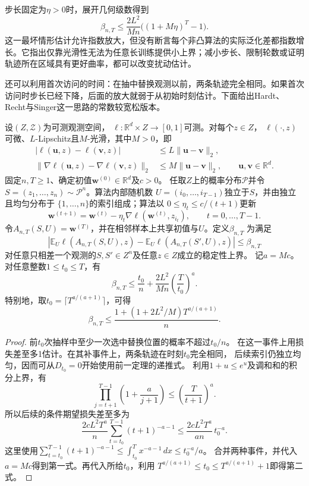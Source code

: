 步长固定为$\eta>0$时，展开几何级数得到
\[
 \beta_{n,T}\leq\frac{2L^2}{Mn}\bigl((1+M\eta)^T-1\bigr).
\]
这一最坏情形估计允许指数放大，但没有断言每个非凸算法的实际泛化差都指数增长。它指出仅靠光滑性无法为任意长训练提供小上界；减小步长、限制轮数或证明轨迹所在区域具有更好曲率，都可以改变扰动估计。

还可以利用首次访问的时间：在抽中替换观测以前，两条轨迹完全相同。如果首次访问时步长已经下降，后面的放大就弱于从初始时刻估计。下面给出Hardt、Recht与Singer这一思路的常数较宽松版本。

\begin{theorem}[递减步长的非凸SGD泛化界]
\label{thm:nonconvex-sgd-decay}
设$(Z,\mathcal Z)$为可测观测空间，
$\ell:\mathbb R^d\times Z\to[0,1]$可测。对每个$z\in Z$，
$\ell(\cdot,z)$可微、$L$-Lipschitz且$M$-光滑，其中$M>0$，即
\[
\begin{aligned}
 |\ell(\bm u,z)-\ell(\bm v,z)|
 &\leq L\|\bm u-\bm v\|_2,\\
 \|\nabla\ell(\bm u,z)-\nabla\ell(\bm v,z)\|_2
 &\leq M\|\bm u-\bm v\|_2,
 \qquad \bm u,\bm v\in\mathbb R^d.
\end{aligned}
\]
固定$n,T\geq1$、确定初值$\bm w^{(0)}\in\mathbb R^d$及$c>0$。
任取$Z$上的概率分布$\mathcal P$并令
$S=(z_1,\ldots,z_n)\sim\mathcal P^n$。算法内部随机数
$U=(i_0,\ldots,i_{T-1})$独立于$S$，并由独立且均匀分布于
$\{1,\ldots,n\}$的索引组成；算法以
$0\leq\eta_t\leq c/(t+1)$更新
\[
 \bm w^{(t+1)}
 =\bm w^{(t)}-\eta_t\nabla\ell(\bm w^{(t)},z_{i_t}),
 \qquad t=0,\ldots,T-1.
\]
令$A_{n,T}(S,U)=\bm w^{(T)}$，并在相邻样本上共享初值与$U$。定义$\beta_{n,T}$
为满足
\[
 \left|\mathbb E_U\ell(A_{n,T}(S,U),z)
 -\mathbb E_U\ell(A_{n,T}(S',U),z)\right|\leq\beta_{n,T}
\]
对任意只相差一个观测的$S,S'\in Z^n$及任意$z\in Z$成立的稳定性上界。
记$a=Mc$。对任意整数$1\leq t_0\leq T$，有
\[
 \beta_{n,T}\leq\frac{t_0}{n}
       +\frac{2L^2}{Mn}\left(\frac{T}{t_0}\right)^a.
\]
特别地，取$t_0=\lceil T^{a/(a+1)}\rceil$，可得
\[
 \beta_{n,T}\leq
 \frac{1+(1+2L^2/M)T^{a/(a+1)}}{n}.
\]
\end{theorem}
\begin{proof}
前$t_0$次抽样中至少一次选中替换位置的概率不超过$t_0/n$。
在这一事件上用损失差至多1估计。在其补事件上，两条轨迹在时刻$t_0$完全相同，
后续索引仍独立均匀，因而可从$D_{t_0}=0$开始使用前一定理的递推式。
利用$1+u\leq e^u$及调和和的积分上界，有
\[
 \prod_{j=t+1}^{T-1}\left(1+\frac a{j+1}\right)
 \leq\left(\frac T{t+1}\right)^a.
\]
所以后续的条件期望损失差至多为
\[
 \frac{2cL^2T^a}{n}\sum_{t=t_0}^{T-1}(t+1)^{-a-1}
 \leq\frac{2cL^2T^a}{an}\,t_0^{-a}.
\]
这里使用$\sum_{t=t_0}^{T-1}(t+1)^{-a-1}\leq\int_{t_0}^{T}x^{-a-1}\,dx\leq t_0^{-a}/a$。
合并两种事件，并代入$a=Mc$得到第一式。再代入所给$t_0$，利用
$T^{a/(a+1)}\leq t_0\leq T^{a/(a+1)}+1$即得第二式。
\end{proof}

